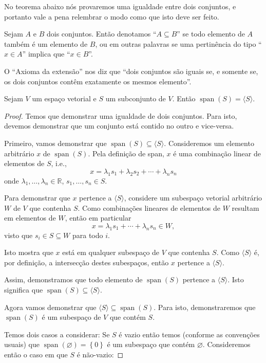 No teorema abaixo nós provaremos uma igualdade entre dois conjuntos, e portanto vale a pena relembrar o modo como que isto deve ser feito.

Sejam $A$ e $B$ dois conjuntos. Então denotamos ``$A\subseteq B$'' se todo elemento de $A$ também é um elemento de $B$, ou em outras palavras se uma pertinência do tipo ``$x\in A$'' implica que ``$x\in B$''.

O ``Axioma da extensão'' nos diz que ``dois conjuntos são iguais se, e somente se, os dois conjuntos contêm exatamente os mesmos elemento''. 

\begin{theorem}
	Sejam $V$ um espaço vetorial e $S$ um subconjunto de $V$. Então $\operatorname{span}(S)=\langle S\rangle$.
\end{theorem}
\begin{proof}
	Temos que demonstrar uma igualdade de dois conjuntos. Para isto, devemos demonstrar que um conjunto está contido no outro e vice-versa.
	
	Primeiro, vamos demonstrar que $\operatorname{span}(S)\subseteq\langle S\rangle$. Consideremos um elemento arbitrário $x$ de $\operatorname{span}(S)$. Pela definição de span, $x$ é uma combinação linear de elementos de $S$, i.e.,
	\[x=\lambda_1 s_1+\lambda_2 s_2+\cdots+\lambda_n s_n\]
	onde $\lambda_1,\ldots,\lambda_n\in\mathbb{R}$, $s_1,\ldots,s_n\in S$.
	
	Para demonstrar que $x$ pertence a $\langle S\rangle$, considere um subespaço vetorial arbitrário $W$ de $V$ que contenha $S$. Como combinações lineares de elementos de $W$ resultam em elementos de $W$, então em particular
	\[x=\lambda_1s_1+\cdots+\lambda_n s_n\in W,\]
	visto que $s_i\in S\subseteq W$ para todo $i$.
	
	Isto mostra que $x$ está em qualquer subespaço de $V$ que contenha $S$. Como $\langle S\rangle$ é, por definição, a intersecção destes subespaços, então $x$ pertence a $\langle S\rangle$.
	
	Assim, demonstramos que todo elemento de $\operatorname{span}(S)$ pertence a $\langle S\rangle$. Isto significa que $\operatorname{span}(S)\subseteq\langle S\rangle$.
	
	Agora vamos demonstrar que $\langle S\rangle\subseteq\operatorname{span}(S)$. Para isto, demonstraremos que $\operatorname{span}(S)$ é um subespaço de $V$ que contém $S$. 
	
	Temos dois casos a considerar: Se $S$ é vazio então temos (conforme as convenções usuais) que $\operatorname{span}(\varnothing)=\left\{0\right\}$ é um subespaço que contém $\varnothing$. Consideremos então o caso em que $S$ é não-vazio:
	

\end{proof}
